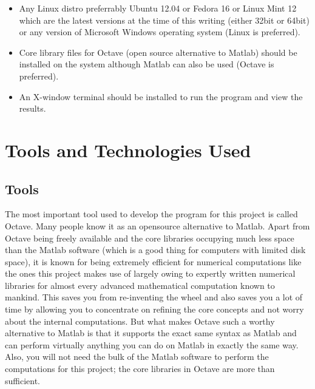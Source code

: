 \documentclass[11pt,a4paper]{report}
\begin{document}
{\bigskip
\begin{itemize}
\item Any Linux distro preferrably Ubuntu 12.04 or Fedora 16 or Linux Mint 12 which are the latest versions at the time of this writing (either 32bit or 64bit) or any version of Microsoft Windows operating system (Linux is preferred).
\item Core library files for Octave (open source alternative to Matlab) should be installed on the system although Matlab can also be used (Octave is preferred).
\item An X-window terminal should be installed to run the program and view the results.
\end{itemize}




\chapter{Tools and Technologies Used}

\section{Tools}

The most important tool used to develop the program for this project is called Octave. Many people know it as an opensource alternative to Matlab. Apart from Octave being freely available and the core libraries occupying much less space than the Matlab software (which is a good thing for computers with limited disk space), it is known for being extremely efficient for numerical computations like the ones this project makes use of largely owing to expertly written numerical libraries for almost every advanced mathematical computation known to mankind. This saves you from re-inventing the wheel and also saves you a lot of time by allowing you to concentrate on refining the core concepts and not worry about the internal computations. But what makes Octave such a worthy alternative to Matlab is that it supports the exact same syntax as Matlab and can perform virtually anything you can do on Matlab in exactly the same way. Also, you will not need the bulk of the Matlab software to perform the computations for this project; the core libraries in Octave are more than sufficient.\\

}
\end{document}

